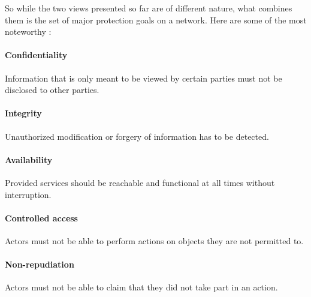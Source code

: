 So while the two views presented so far are of different nature, what combines them is the set of major protection goals on a network. Here are some of the most noteworthy \cite{goals}:

\paragraph{Confidentiality} Information that is only meant to be viewed by certain parties must not be disclosed to other parties.

\paragraph{Integrity} Unauthorized modification or forgery of information has to be detected.


\paragraph{Availability} Provided services should be reachable and functional at all times without interruption.


\paragraph{Controlled access} Actors must not be able to perform actions on objects they are not permitted to.

\paragraph{Non-repudiation} Actors must not be able to claim that they did not take part in an action.


